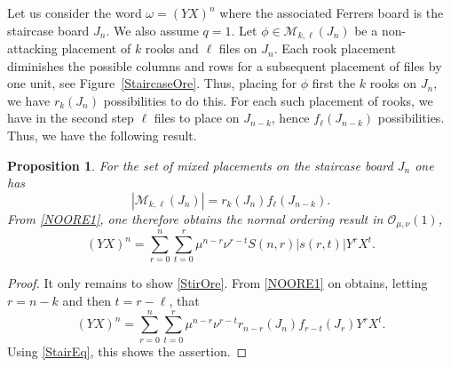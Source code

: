 \documentclass[10pt]{amsart}
\newtheorem{proposition}[theorem]{Proposition}%
\begin{document}
Let us consider the word $\omega=(YX)^n$ where the associated Ferrers board is the staircase board $J_n$. We also assume $q=1$. Let $ \phi \in {\mathcal M}_{k,\ell}(J_n)$ be a non-attacking placement of $k$ rooks and $\ell$ files  on $J_n$. Each rook placement diminishes the possible columns and rows for a subsequent placement of files by one unit, see Figure~\ref{StaircaseOre}. Thus, placing for $\phi $ first the $k$ rooks on $J_n$, we have $r_k(J_n)$ possibilities to do this. For each such placement of rooks, we have in the second step $\ell$ files to place on $J_{n-k}$, hence $f_{\ell}(J_{n-k})$ possibilities. Thus, we have the following result.
\begin{proposition} For the set of mixed placements on the staircase board $J_n$ one has
\begin{equation}\label{MixedPlEx}
|{\mathcal M}_{k,\ell}(J_n)| = r_k(J_n) f_{\ell}(J_{n-k}). 
\end{equation}
From \eqref{NOORE1}, one therefore obtains the normal ordering result in  ${\mathcal O}_{\mu,\nu}(1)$,
\begin{equation}\label{StirOre}
(YX)^n =  \sum_{r=0}^{n} \sum_{t=0}^{r} \mu^{n-r} \nu^{r-t} S(n,r) |s(r,t)| Y^{r} X^{t}.
\end{equation}
\end{proposition}
\begin{proof}
It only remains to show \eqref{StirOre}. From \eqref{NOORE1} on obtains, letting $r=n-k$ and then $t=r-\ell$, that 
$$
(YX)^n = \sum_{r=0}^{n} \sum_{t=0}^{r} \mu^{n-r} \nu^{r-t} r_{n-r}(J_n) f_{r-t}(J_{r})  Y^{r}X^{t}.
$$
Using \eqref{StairEq}, this shows the assertion.
\end{proof}
\end{document}
